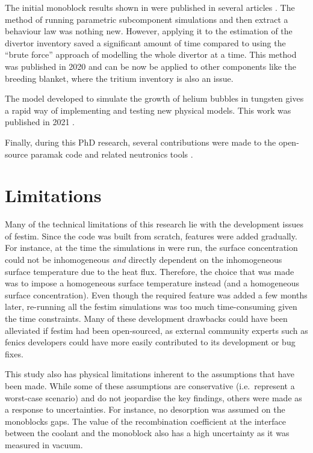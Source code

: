 The initial monoblock results shown in  were published in several articles \cite{delaporte-mathurin_finite_2019, delaporte-mathurin_parametric_2021, delaporte-mathurin_influence_2021-1}.
The method of running parametric subcomponent simulations and then extract a behaviour law was nothing new.
However, applying it to the estimation of the \gls{divertor} inventory saved a significant amount of time compared to using the ``brute force'' approach of modelling the whole \gls{divertor} at a time.
This method was published in 2020 \cite{delaporte-mathurin_parametric_2020} and can be now be applied to other components like the \gls{breeding blanket}, where the tritium inventory is also an issue.

The model developed to simulate the growth of helium bubbles in tungsten gives a rapid way of implementing and testing new physical models.
This work was published in 2021 \cite{delaporte-mathurin_influence_2021}.

Finally, during this PhD research, several contributions were made to the open-source \gls{paramak} code and related neutronics tools \cite{shimwell_paramak_2021}.

\section*{Limitations}

Many of the technical limitations of this research lie with the development issues of \gls{festim}.
Since the code was built from scratch, features were added gradually.
For instance, at the time the simulations in  were run, the surface concentration could not be inhomogeneous \emph{and} directly dependent on the inhomogeneous surface temperature due to the heat flux.
Therefore, the choice that was made was to impose a homogeneous surface temperature instead (and a homogeneous surface concentration).
Even though the required feature was added a few months later, re-running all the \gls{festim} simulations was too much time-consuming given the time constraints.
Many of these development drawbacks could have been alleviated if \gls{festim} had been open-sourced, as external community experts such as \gls{fenics} developers could have more easily contributed to its development or bug fixes.

This study also has physical limitations inherent to the assumptions that have been made.
While some of these assumptions are conservative (i.e.\ represent a worst-case scenario) and do not jeopardise the key findings, others were made as a response to uncertainties.
For instance, no desorption was assumed on the monoblocks gaps.
The value of the recombination coefficient at the interface between the coolant and the monoblock also has a high uncertainty as it was measured in vacuum.


